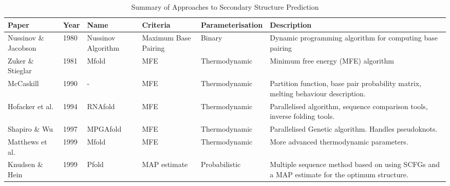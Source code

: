 \documentclass[journal]{IEEEtran}
\begin{document}
\begin{table}[t]
\centering
\caption{Summary of Approaches to Secondary Structure Prediction}
\label{table:summary-secondary-papers}
\begin{tabular}{|l|l|l|l|l|p{5cm}|}
\hline
\textbf{Paper}                                                   & \textbf{Year} & \textbf{Name}      & \textbf{Criteria}    & \textbf{Parameterisation} & \textbf{Description}                                                                                       \\ \hline
Nussinov \& Jacobson \cite{nussinov1980fast}                     & 1980          & Nussinov Algorithm & Maximum Base Pairing & Binary                    & Dynamic programming algorithm for computing base pairing                                                   \\ \hline
Zuker \& Stieglar \cite{zuker1981optimal}                        & 1981          & Mfold              & MFE                  & Thermodynamic             & Minimum free energy (MFE) algorithm                                                                        \\ \hline
McCaskill \cite{mccaskill1990equilibrium}                        & 1990          & -                  & MFE                  & Thermodynamic             & Partition function, base pair probability matrix, melting behaviour description.                           \\ \hline
Hofacker et al. \cite{hofacker1994fast}                          & 1994          & RNAfold            & MFE                  & Thermodynamic             & Parallelised algorithm, sequence comparison tools, inverse folding tools.                                  \\ \hline
Shapiro \& Wu \cite{shapiro1997predicting, shapiro1994massively} & 1997          & MPGAfold           & MFE                  & Thermodynamic             & Parallelised Genetic algorithm. Handles pseudoknots.                                                       \\ \hline
Matthews et al. \cite{mathews1999expanded}                       & 1999          & Mfold              & MFE                  & Thermodynamic             & More advanced thermodynamic parameters.                                                                    \\ \hline
Knudsen \& Hein \cite{knudsen1999rna, knudsen2003pfold}          & 1999          & Pfold              & MAP estimate         & Probabilistic             & Multiple sequence method based on using SCFGs and a MAP estimate for the optimum structure.                \\ \hline

\end{tabular}
\end{table}
\end{document}
